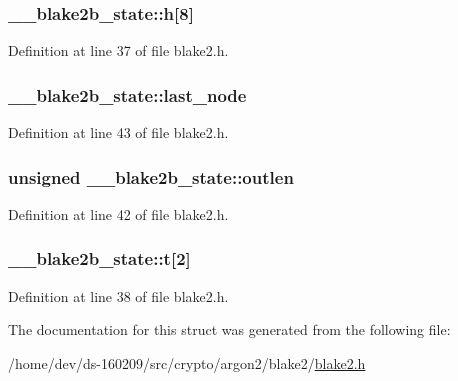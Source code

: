 \subsubsection[{h}]{ \+\_\+\+\_\+blake2b\+\_\+state\+::h\mbox{[}8\mbox{]}}\label{struct____blake2b__state_a98f8e01951c0944e82dff97c9a5ae700}


Definition at line 37 of file blake2.\+h.

\hypertarget{struct____blake2b__state_a0b50544072b2bf05c743bdb65c1015cd}{}
\subsubsection[{last\+\_\+node}]{ \+\_\+\+\_\+blake2b\+\_\+state\+::last\+\_\+node}\label{struct____blake2b__state_a0b50544072b2bf05c743bdb65c1015cd}


Definition at line 43 of file blake2.\+h.

\hypertarget{struct____blake2b__state_aa5803608622e985dd48d6b36f8761a57}{}
\subsubsection[{outlen}]{\setlength{\rightskip}{0pt plus 5cm}unsigned \+\_\+\+\_\+blake2b\+\_\+state\+::outlen}\label{struct____blake2b__state_aa5803608622e985dd48d6b36f8761a57}


Definition at line 42 of file blake2.\+h.

\hypertarget{struct____blake2b__state_a5a249e17d3c4ffc78b512430a8f053b2}{}
\subsubsection[{t}]{ \+\_\+\+\_\+blake2b\+\_\+state\+::t\mbox{[}2\mbox{]}}\label{struct____blake2b__state_a5a249e17d3c4ffc78b512430a8f053b2}


Definition at line 38 of file blake2.\+h.



The documentation for this struct was generated from the following file\+:\begin{DoxyCompactItemize}
\item 
/home/dev/ds-\/160209/src/crypto/argon2/blake2/\hyperlink{blake2_8h}{blake2.\+h}\end{DoxyCompactItemize}
